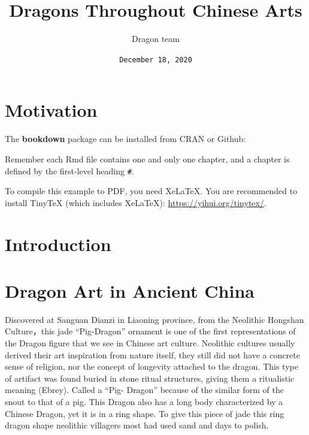 \documentclass[
]{book}
\title{Dragons Throughout Chinese Arts}
\author{Dragon team}
\date{\texttt{December\ 18,\ 2020}}
\begin{document}
\maketitle

{
\setcounter{tocdepth}{1}
\tableofcontents
}
\hypertarget{motivation}{%
\chapter*{Motivation}\label{motivation}}

The \textbf{bookdown} package can be installed from CRAN or Github:

Remember each Rmd file contains one and only one chapter, and a chapter is defined by the first-level heading \texttt{\#}.

To compile this example to PDF, you need XeLaTeX. You are recommended to install TinyTeX (which includes XeLaTeX): \url{https://yihui.org/tinytex/}.

\hypertarget{intro}{%
\chapter*{Introduction}\label{intro}}

\hypertarget{ancient}{%
\chapter*{Dragon Art in Ancient China}\label{ancient}}

Discovered at Sanguan Dianzi in Liaoning province, from the Neolithic Hongshan Culture，this jade ``Pig-Dragon'' ornament is one of the first representations of the Dragon figure that we see in Chinese art culture. Neolithic cultures usually derived their art inspiration from nature itself, they still did not have a concrete sense of religion, nor the concept of longevity attached to the dragon. This type of artifact was found buried in stone ritual structures, giving them a ritualistic meaning (Ebrey).
Called a ``Pig- Dragon'' because of the similar form of the snout to that of a pig. This Dragon also has a long body characterized by a Chinese Dragon, yet it is in a ring shape. To give this piece of jade this ring dragon shape neolithic villagers most had used sand and days to polish.
\end{document}
